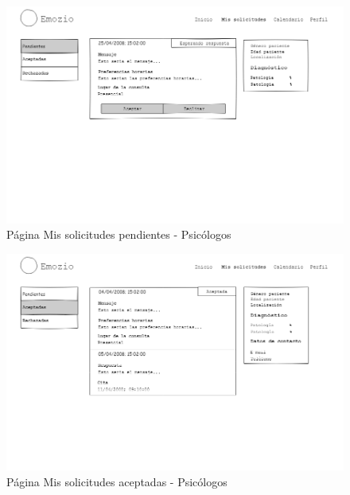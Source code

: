\begin{figure}[htbp] 
    \centering
    \includegraphics[width=1\textwidth]{figuras/mockup_psicologos/mailpendientes.png}
    \caption{Página Mis solicitudes pendientes - Psicólogos}
\end{figure}	

\begin{figure}[htbp] 
    \centering
    \includegraphics[width=1\textwidth]{figuras/mockup_psicologos/mailaceptadas.png}
    \caption{Página Mis solicitudes aceptadas - Psicólogos}
\end{figure}	

